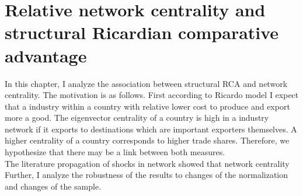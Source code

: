 \chapter{Relative network centrality and structural Ricardian comparative advantage}
In this chapter, I analyze the association between structural RCA  and network centrality.
 The motivation is as follows.
First according to Ricardo model  I expect that a industry within a country with relative lower cost to produce and export more a good.
The eigenvector centrality  of a country is high in a industry network if it exports to destinations which are important exporters themselves.
 A higher centrality of a country corresponds to higher trade shares.
 Therefore, we hypothesize that there may be a link between both measures. \\
The literature propagation of shocks in network  \cite{acemoglu2012} showed that network centrality
Further, I analyze the robustness of the results to changes of the normalization and  changes of the sample.
